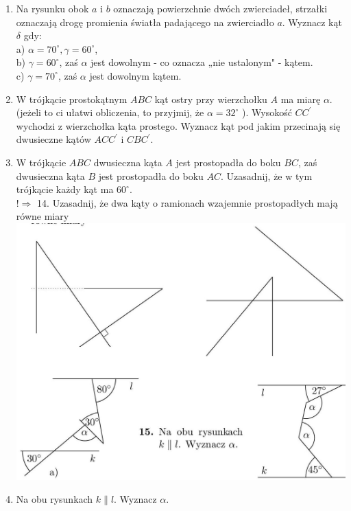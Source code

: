 \documentclass[10pt]{article}
\begin{document}
\begin{enumerate}
  \item Na rysunku obok \(a\) i \(b\) oznaczają powierzchnie dwóch zwierciadeł, strzałki oznaczają drogę promienia światła padającego na zwierciadło \(a\). Wyznacz kąt \(\delta\) gdy:\\
a) \(\alpha=70^{\circ}, \gamma=60^{\circ}\),\\
b) \(\gamma=60^{\circ}\), zaś \(\alpha\) jest dowolnym - co oznacza „nie ustalonym" - kątem.\\
c) \(\gamma=70^{\circ}\), zaś \(\alpha\) jest dowolnym kątem.
  \item W trójkącie prostokątnym \(A B C\) kąt ostry przy wierzchołku \(A\) ma miarę \(\alpha\). (jeżeli to ci ułatwi obliczenia, to przyjmij, że \(\alpha=32^{\circ}\) ). Wysokość \(C C^{\prime}\) wychodzi z wierzchołka kąta prostego. Wyznacz kąt pod jakim przecinają się dwusieczne kątów \(A C C^{\prime}\) i \(C B C^{\prime}\).
  \item W trójkącie \(A B C\) dwusieczna kąta \(A\) jest prostopadła do boku \(B C\), zaś dwusieczna kąta \(B\) jest prostopadła do boku \(A C\). Uzasadnij, że w tym trójkącie każdy kąt ma \(60^{\circ}\).\\
\(!\Rightarrow\) 14. Uzasadnij, że dwa kąty o ramionach wzajemnie prostopadłych mają równe miary\\
\includegraphics[max width=\textwidth, center]{2024_11_21_71f62bd117d375398909g-020(2)}
  \item Na obu rysunkach \(k \| l\). Wyznacz \(\alpha\).\\

\end{enumerate}
\end{document}
